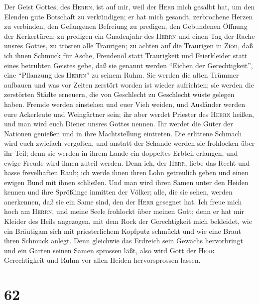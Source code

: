  Der Geist Gottes, des \textsc{Herrn}, ist auf mir, weil
der \textsc{Herr} mich gesalbt hat, um den Elenden gute Botschaft zu
verkündigen; er hat mich gesandt, zerbrochene Herzen zu verbinden, den
Gefangenen Befreiung zu predigen, den Gebundenen Öffnung der
Kerkertüren;  zu predigen ein Gnadenjahr des
\textsc{Herrn} und einen Tag der Rache unsres Gottes, zu trösten alle
Traurigen;  zu achten auf die Traurigen in Zion, daß ich
ihnen Schmuck für Asche, Freudenöl statt Traurigkeit und Feierkleider
statt eines betrübten Geistes gebe, daß sie genannt werden ``Eichen der
Gerechtigkeit'', eine ``Pflanzung des \textsc{Herrn}'' zu seinem Ruhm.
 Sie werden die alten Trümmer aufbauen und was vor Zeiten
zerstört worden ist wieder aufrichten; sie werden die zerstörten Städte
erneuern, die von Geschlecht zu Geschlecht wüste gelegen haben.
 Fremde werden einstehen und euer Vieh weiden, und
Ausländer werden eure Ackerleute und Weingärtner sein; 
ihr aber werdet Priester des \textsc{Herrn} heißen, und man wird euch
Diener unsres Gottes nennen. Ihr werdet die Güter der Nationen genießen
und in ihre Machtstellung eintreten.  Die erlittene
Schmach wird euch zwiefach vergolten, und anstatt der Schande werden sie
frohlocken über ihr Teil; denn sie werden in ihrem Lande ein doppeltes
Erbteil erlangen, und ewige Freude wird ihnen zuteil werden.
 Denn ich, der \textsc{Herr}, liebe das Recht und hasse
frevelhaften Raub; ich werde ihnen ihren Lohn getreulich geben und einen
ewigen Bund mit ihnen schließen.  Und man wird ihren Samen
unter den Heiden kennen und ihre Sprößlinge inmitten der Völker; alle,
die sie sehen, werden anerkennen, daß sie ein Same sind, den der
\textsc{Herr} gesegnet hat.  Ich freue mich hoch am
\textsc{Herrn}, und meine Seele frohlockt über meinen Gott; denn er hat
mir Kleider des Heils angezogen, mit dem Rock der Gerechtigkeit mich
bekleidet, wie ein Bräutigam sich mit priesterlichem Kopfputz schmückt
und wie eine Braut ihren Schmuck anlegt.  Denn gleichwie
das Erdreich sein Gewächs hervorbringt und ein Garten seinen Samen
sprossen läßt, also wird Gott der \textsc{Herr} Gerechtigkeit und Ruhm
vor allen Heiden hervorsprossen lassen.

\hypertarget{section-61}{%
\section{62}\label{section-61}}

